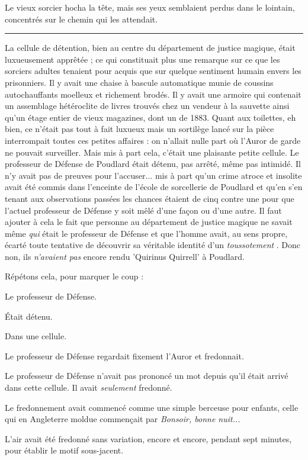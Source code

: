 Le vieux sorcier hocha la tête, mais ses yeux semblaient perdus dans le lointain, concentrés sur le chemin qui les attendait.
\par\noindent\rule{\textwidth}{0.4pt}
La cellule de détention, bien au centre du département de justice magique, était luxueusement apprêtée ; ce qui constituait plus une remarque sur ce que les sorciers adultes tenaient pour acquis que sur quelque sentiment humain envers les prisonniers. Il y avait une chaise à bascule automatique munie de coussins autochauffants moelleux et richement brodés. Il y avait une armoire qui contenait un assemblage hétéroclite de livres trouvés chez un vendeur à la sauvette ainsi qu'un étage entier de vieux magazines, dont un de 1883. Quant aux toilettes, eh bien, ce n'était pas tout à fait luxueux mais un sortilège lancé sur la pièce interrompait toutes ces petites affaires : on n'allait nulle part où l'Auror de garde ne pouvait surveiller. Mais mis à part cela, c'était une plaisante petite cellule. Le professeur de Défense de Poudlard était détenu, pas arrêté, même pas intimidé. Il n'y avait pas de preuves pour l'accuser... mis à part qu'un crime atroce et insolite avait été commis dans l'enceinte de l'école de sorcellerie de Poudlard et qu'en s'en tenant aux observations passées les chances étaient de cinq contre une pour que l'actuel professeur de Défense y soit mêlé d'une façon ou d'une autre. Il faut ajouter à cela le fait que personne au département de justice magique ne savait même \emph{qui}  était le professeur de Défense et que l'homme avait, au sens propre, écarté toute tentative de découvrir sa véritable identité d'un \emph{toussotement} . Donc non, ils \emph{n'avaient pas}  encore rendu 'Quirinus Quirrell' à Poudlard.

Répétons cela, pour marquer le coup :

Le professeur de Défense.

Était détenu.

Dans une cellule.

Le professeur de Défense regardait fixement l'Auror et fredonnait.

Le professeur de Défense n'avait pas prononcé un mot depuis qu'il était arrivé dans cette cellule. Il avait \emph{seulement}  fredonné.

Le fredonnement avait commencé comme une simple berceuse pour enfants, celle qui en Angleterre moldue commençait par \emph{Bonsoir, bonne nuit...} 

L'air avait été fredonné sans variation, encore et encore, pendant sept minutes, pour établir le motif sous-jacent.

